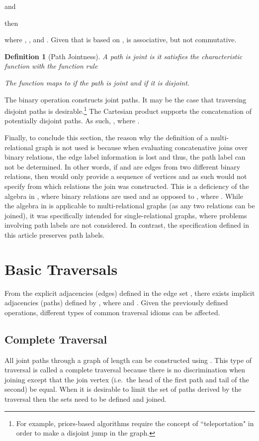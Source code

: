 \documentclass[10pt,conference,letterpaper]{IEEEtran}
\newtheorem{definition}{Definition}
\begin{document}
and

then

where , , and . Given that  is based on ,  is associative, but not commutative.
\begin{definition}[Path Jointness]
A path is joint is it satisfies the characteristic function  with the function rule

The function maps to  if the path is joint and  if it is disjoint.
\end{definition}
The binary operation  constructs joint paths. It may be the case that traversing disjoint paths is desirable.\footnote{For example, priors-based algorithms require the concept of ``teleportation" in order to make a disjoint jump in the graph.} The Cartesian product supports the concatenation of potentially disjoint paths. As such, , where .

Finally, to conclude this section, the reason why the  definition of a multi-relational graph is not used is because when evaluating concatenative joins over binary relations, the edge label information is lost and thus, the path label can not be determined. In other words, if  and  are edges from two different binary relations, then  would only provide a sequence of vertices and as such would not specify from which relations the join was constructed. This is a deficiency of the algebra in \cite{graphalg:russling1995}, where binary relations are used and  as opposed to , where . While the algebra in \cite{graphalg:russling1995} is applicable to multi-relational graphs (as any two relations can be joined), it was specifically intended for single-relational graphs, where problems involving path labels are not considered. In contrast, the specification defined in this article preserves path labels.

\section{Basic Traversals\label{sec:basic}}

From the explicit adjacencies (edges) defined in the edge set , there exists implicit adjacencies (paths) defined by , where  and . Given the previously defined operations, different types of common traversal idioms can be affected. 

\subsection{Complete Traversal}

All joint paths through a graph of length  can be constructed using . This type of traversal is called a complete traversal because there is no discrimination when joining except that the join vertex (i.e.~the head of the first path and tail of the second) be equal. When it is desirable to limit the set of paths derived by the traversal then the sets  need to be defined and joined.
\end{document}
